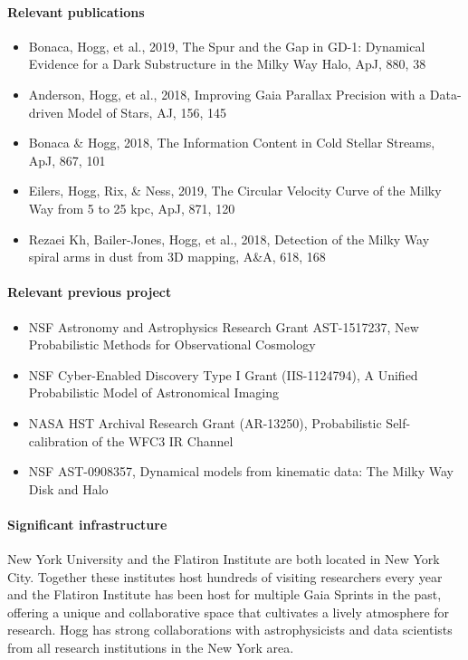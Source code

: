 \paragraph{Relevant publications}
\begin{itemize}
    \item Bonaca, Hogg, et al., 2019, The Spur and the Gap in GD-1: Dynamical Evidence for a Dark Substructure in the Milky Way Halo, ApJ, 880, 38
    \item Anderson, Hogg, et al., 2018, Improving Gaia Parallax Precision with a Data-driven Model of Stars, AJ, 156, 145
    \item Bonaca \& Hogg, 2018, The Information Content in Cold Stellar Streams, ApJ, 867, 101
    \item Eilers, Hogg, Rix, \& Ness, 2019, The Circular Velocity Curve of the Milky Way from 5 to 25 kpc, ApJ, 871, 120
    \item Rezaei Kh, Bailer-Jones, Hogg, et al., 2018, Detection of the Milky Way spiral arms in dust from 3D mapping, A\&A, 618, 168
\end{itemize}

\paragraph{Relevant previous project}
\begin{itemize}
    \item NSF Astronomy and Astrophysics Research Grant AST-1517237, New Probabilistic Methods for Observational Cosmology
    \item NSF Cyber-Enabled Discovery Type I Grant (IIS-1124794), A Unified Probabilistic Model of Astronomical Imaging
    \item NASA HST Archival Research Grant (AR-13250), Probabilistic Self-calibration of the WFC3 IR Channel
    \item NSF AST-0908357, Dynamical models from kinematic data: The Milky Way Disk and Halo
\end{itemize}

\paragraph{Significant infrastructure}
New York University and the Flatiron Institute are both located in New York City. Together these institutes host hundreds of visiting researchers every year and the Flatiron Institute has been host for multiple Gaia Sprints in the past, offering a unique and collaborative space that cultivates a lively atmosphere for research.
Hogg has strong collaborations with astrophysicists and data scientists from all research institutions in the New York area.
